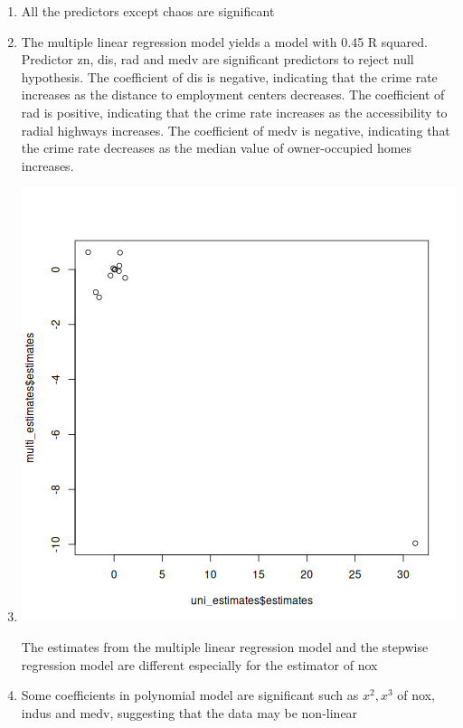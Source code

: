 \documentclass{article}
\begin{document}
\begin{enumerate}[label=(\alph*)]
  \item All the predictors except chaos are significant
  \item The multiple linear regression model yields a model with 0.45 R squared. Predictor zn, dis, rad and medv are significant predictors to reject null hypothesis. The coefficient of dis is negative, indicating that the crime rate increases as the distance to employment centers decreases. The coefficient of rad is positive, indicating that the crime rate increases as the accessibility to radial highways increases. The coefficient of medv is negative, indicating that the crime rate decreases as the median value of owner-occupied homes increases.
  \item \includegraphics[scale=0.5]{q15.png}

    The estimates from the multiple linear regression model and the stepwise regression model are different especially for the estimator of nox
  \item Some coefficients in polynomial model are significant such as \(x^2, x^3\) of nox, indus and medv, suggesting that the data may be non-linear
\end{enumerate}
\newpage
\end{document}
